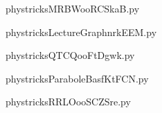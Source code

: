     

    \clearpage
    


    \newcommand{\CaptionFigMRBWooRCSkaB}{<+Type your caption here+>}
    \begin{center}
        
    \end{center}
    phystricksMRBWooRCSkaB.py

    

    \clearpage
    


    \newcommand{\CaptionFigLectureGraphnrkEEM}{<+Type your caption here+>}
    \begin{center}
        
    \end{center}
    phystricksLectureGraphnrkEEM.py

    

    \clearpage
    


    \newcommand{\CaptionFigQTCQooFtDgwk}{<+Type your caption here+>}
    \begin{center}
        
    \end{center}
    phystricksQTCQooFtDgwk.py

    

    \clearpage
    


    \newcommand{\CaptionFigParaboleBasfKtFCN}{<+Type your caption here+>}
    \begin{center}
        
    \end{center}
    phystricksParaboleBasfKtFCN.py

    

    \clearpage
    


    \newcommand{\CaptionFigRRLOooSCZSre}{<+Type your caption here+>}
    \begin{center}
        
    \end{center}
    phystricksRRLOooSCZSre.py

    

    \clearpage
    

